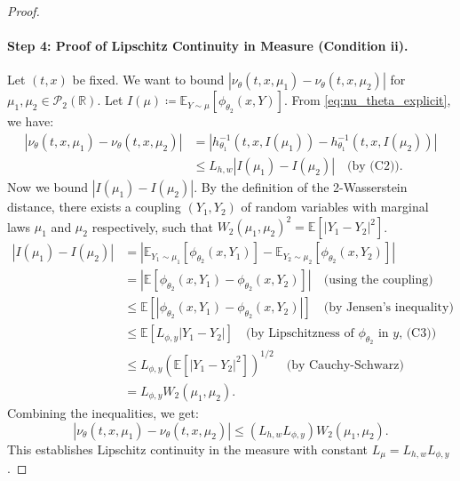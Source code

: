 \documentclass[10pt,a4paper]{amsart}
\newcommand{\E}{\mathbb{E}}
\newcommand{\Pcal}{\mathcal{P}}
\newcommand{\R}{\mathbb{R}}
\begin{document}
\begin{proof}
\paragraph{Step 4: Proof of Lipschitz Continuity in Measure (Condition ii).}
Let $(t,x)$ be fixed. We want to bound $|\nu_\theta(t, x, \mu_1) - \nu_\theta(t, x, \mu_2)|$ for $\mu_1, \mu_2 \in \Pcal_2(\R)$.
Let $I(\mu) \coloneqq \mathbb{E}_{Y \sim \mu}[\phi_{\theta_2}(x, Y)]$. From \eqref{eq:nu_theta_explicit}, we have:
\begin{align*}
    |\nu_\theta(t, x, \mu_1) - \nu_\theta(t, x, \mu_2)| &= |h_{\theta_1}^{-1}(t,x,I(\mu_1)) - h_{\theta_1}^{-1}(t,x,I(\mu_2))| \\
    &\le L_{h,w} |I(\mu_1) - I(\mu_2)| \quad \text{(by (C2))}.
\end{align*}
Now we bound $|I(\mu_1) - I(\mu_2)|$. By the definition of the 2-Wasserstein distance, there exists a coupling $(Y_1, Y_2)$ of random variables with marginal laws $\mu_1$ and $\mu_2$ respectively, such that $W_2(\mu_1, \mu_2)^2 = \E[|Y_1-Y_2|^2]$.
\begin{align*}
    |I(\mu_1) - I(\mu_2)| &= |\E_{Y_1 \sim \mu_1}[\phi_{\theta_2}(x, Y_1)] - \E_{Y_2 \sim \mu_2}[\phi_{\theta_2}(x, Y_2)]| \\
    &= |\E[\phi_{\theta_2}(x, Y_1) - \phi_{\theta_2}(x, Y_2)]| \quad \text{(using the coupling)} \\
    &\le \E[|\phi_{\theta_2}(x, Y_1) - \phi_{\theta_2}(x, Y_2)|] \quad \text{(by Jensen's inequality)} \\
    &\le \E[L_{\phi,y}|Y_1 - Y_2|] \quad \text{(by Lipschitzness of $\phi_{\theta_2}$ in $y$, (C3))} \\
    &\le L_{\phi,y} \left( \E[|Y_1 - Y_2|^2] \right)^{1/2} \quad \text{(by Cauchy-Schwarz)} \\
    &= L_{\phi,y} W_2(\mu_1, \mu_2).
\end{align*}
Combining the inequalities, we get:
\[ |\nu_\theta(t, x, \mu_1) - \nu_\theta(t, x, \mu_2)| \le (L_{h,w} L_{\phi,y}) W_2(\mu_1, \mu_2). \]
This establishes Lipschitz continuity in the measure with constant $L_\mu = L_{h,w} L_{\phi,y}$.


\end{proof}
\end{document}
